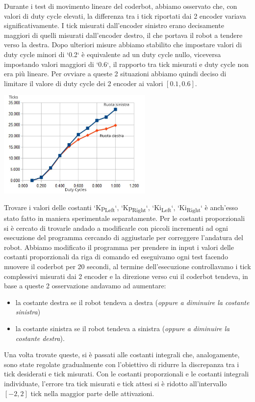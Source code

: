 \documentclass[11pt]{article}
\begin{document}
Durante i test di movimento lineare del coderbot, abbiamo osservato che, con valori di duty cycle elevati, la differenza tra i tick riportati dai 2 encoder variava significativamente. I tick misurati dall'encoder sinistro erano decisamente maggiori di quelli misurati dall'encoder destro, il che portava il robot a tendere verso la destra.
Dopo ulteriori misure abbiamo stabilito che impostare valori di duty cycle minori di `0.2` è equivalente ad un duty cycle nullo, viceversa impostando valori maggiori di `0.6`, il rapporto tra tick misurati e duty cycle non era più lineare. Per ovviare a queste 2 situazioni abbiamo quindi deciso di limitare il valore di duty cycle dei 2 encoder ai valori \(\left[0.1,0.6\right]\).
\begin{center}
\includegraphics[height=200]{./img/pwm-ticks.jpg}
\end{center}

Trovare i valori delle costanti `Kp\textsubscript{Left}`, `Kp\textsubscript{Right}`, `Ki\textsubscript{Left}`, `Ki\textsubscript{Right}` è anch'esso stato fatto in maniera sperimentale separatamente.
Per le costanti proporzionali si è cercato di trovarle andado a modificarle con piccoli incrementi ad ogni esecuzione del programma cercando di aggiustarle per correggere l'andatura del robot. Abbiamo modificato il programma per prendere in input i valori delle costanti proporzionali da riga di comando ed eseguivamo ogni test facendo muovere il coderbot per 20 secondi, al termine dell'esecuzione controllavamo i tick complessivi misurati dai 2 encoder e la direzione verso cui il coderbot tendeva, in base a queste 2 osservazione andavamo ad aumentare:
\begin{itemize}
\item la costante destra se il robot tendeva a destra (\emph{oppure a diminuire la costante sinistra})
\item la costante sinistra se il robot tendeva a sinistra (\emph{oppure a diminuire la costante destra}).
\end{itemize}
Una volta trovate queste, si è passati alle costanti integrali che, analogamente, sono state regolate gradualmente con l'obiettivo di ridurre la discrepanza tra i tick desiderati e tick misurati.
Con le costanti proporzionali e le costanti integrali individuate, l'errore tra tick misurati e tick attesi si è ridotto all'intervallo \([-2,2]\) tick nella maggior parte delle attivazioni.
\end{document}
